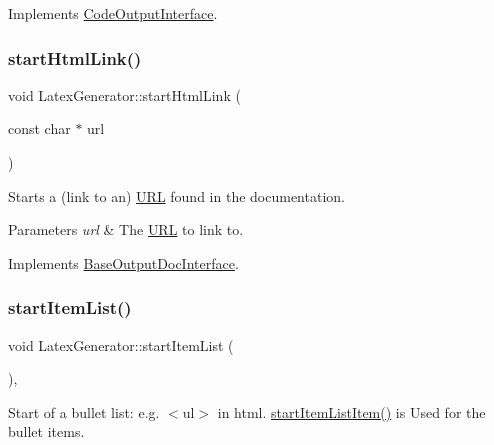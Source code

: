 Implements \mbox{\hyperlink{class_code_output_interface_ac90f75968cdcf127e0b02938bdb49d87}{Code\+Output\+Interface}}.

\mbox{\label{class_latex_generator_a491cb262e91a3f16b37d5dd2017e2f6a}} 
\subsubsection{\texorpdfstring{startHtmlLink()}{startHtmlLink()}}
{\footnotesize\ttfamily void Latex\+Generator\+::start\+Html\+Link (\begin{DoxyParamCaption}\item[{const char $\ast$}]{url }\end{DoxyParamCaption})\hspace{0.3cm}{\ttfamily [virtual]}}

Starts a (link to an) \mbox{\hyperlink{struct_u_r_l}{U\+RL}} found in the documentation. 
\begin{DoxyParams}{Parameters}
{\em url} & The \mbox{\hyperlink{struct_u_r_l}{U\+RL}} to link to. \\
\hline
\end{DoxyParams}


Implements \mbox{\hyperlink{class_base_output_doc_interface_ab52dbf41ce337c701f9cd1e7794f80e7}{Base\+Output\+Doc\+Interface}}.

\mbox{\label{class_latex_generator_a19bab2ba8d61d4a574805610d1a639e6}} 
\subsubsection{\texorpdfstring{startItemList()}{startItemList()}}
{\footnotesize\ttfamily void Latex\+Generator\+::start\+Item\+List (\begin{DoxyParamCaption}{ }\end{DoxyParamCaption})\hspace{0.3cm}{\ttfamily [inline]}, {\ttfamily [virtual]}}

Start of a bullet list\+: e.\+g. {\ttfamily $<$ul$>$} in html. \mbox{\hyperlink{class_latex_generator_ae7a65542a815c62b5a55283fcc68d774}{start\+Item\+List\+Item()}} is Used for the bullet items. 

